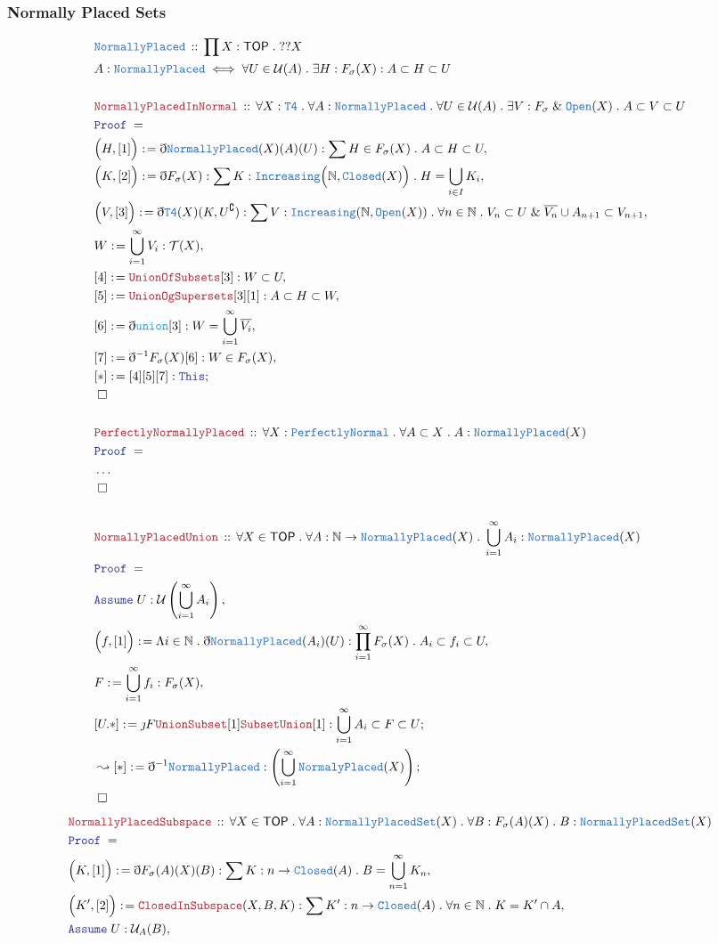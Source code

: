 \documentclass[12pt]{scrartcl}
\newcommand{\TYPE}[1]{\textcolor{NavyBlue}{\mathtt{#1}}}
\newcommand{\FUNC}[1]{\textcolor{Cerulean}{\mathtt{#1}}}
\newcommand{\LOGIC}[1]{\textcolor{Blue}{\mathtt{#1}}}
\newcommand{\THM}[1]{\textcolor{Maroon}{\mathtt{#1}}}
\renewcommand{\.}{\; . \;}
\newcommand{\de}{: \kern 0.1pc =}
\newcommand{\Act}[1]{\left( #1 \right)}
\newcommand{\Theorem}[2]{& \THM{#1} \, :: \, #2 \\ & \Proof = \\ }
\newcommand{\DeclareType}[2]{& \TYPE{#1} \, :: \, #2 \\}
\newcommand{\DefineType}[3]{& #1 : \TYPE{#2} \iff #3 \\}
\newcommand{\Page}[1]{ \begin{align*} #1 \end{align*}   }
\newcommand{ \bd }{ \ByDef }
\newcommand{\NoProof}{ & \ldots \\ \EndProof}
\renewcommand{\And}{\; \& \;}
\newcommand{\Nat}{\mathbb{N} }
\renewcommand{\c}{\complement}
\newcommand{\Say}[3]{& #1 \de #2 : #3, \\}
\newcommand{\Conclude}[3]{& #1 \de #2 : #3; \\}
\newcommand{\DeriveConclude}[3]{& \leadsto #1 \de #2 : #3 ; \\}
\newcommand{\Assume}[2]{& \LOGIC{Assume} \; #1 : #2, \\}
\newcommand{\QED}{\; \square}
\newcommand{\EndProof}{& \QED \\}
\newcommand{\ByDef}{\eth}
\newcommand{\ByConstr}{\jmath}
\newcommand{\Proof}{\LOGIC{Proof} \; }
\newcommand{\PN}{\TYPE{PerfectlyNormal}}
\newcommand{\TOP}{\mathsf{TOP}}
\newcommand{\T}{\mathcal{T}}
\newcommand{\U}{\mathcal{U}}
\begin{document}
\subsubsection{Normally Placed Sets}
\Page{
	\DeclareType{NormallyPlaced}{\prod X : \TOP \. ??X}
	\DefineType{A}{NormallyPlaced}
	{
		\forall U \in \U(A) \.
		\exists H : F_\sigma(X) :
		A \subset H \subset U
	}
	\\
	\Theorem{NormallyPlacedInNormal}
	{
		\forall X : \TYPE{T4} \.
		\forall A : \TYPE{NormallyPlaced} \.
		\forall U \in \U(A) \.
		\exists V : F_\sigma \And \TYPE{Open}(X) \.
		A \subset V \subset U
	}
	\Say{\Big(H,[1]\Big)}{\bd \TYPE{NormallyPlaced}(X)(A)(U)}
	{ \sum H \in F_\sigma(X) \. A \subset H \subset U}
	\Say{\Big(K,[2] \Big)}{ \bd F_\sigma(X)}
	{
		\sum K : \TYPE{Increasing}\Big(\Nat, \TYPE{Closed}(X)\Big) 
		\.
		H = \bigcup_{i \in I} K_i
	}
	\Say{\Big(V,[3]\Big)}{ \bd \TYPE{T4}(X)(K, U^\c)   }
	{ 
		\sum  V : \TYPE{Increasing}(\Nat, \TYPE{Open}(X))  \.    
		\forall n \in \Nat \.   V_n \subset U \And  \overline{V_n} \cup A_{n+1} \subset V_{n+1}
	}
	\Say{W}{\bigcup^\infty_{i=1} V_i}{\T(X)}
	\Say{[4]}{\THM{UnionOfSubsets}[3]}{W \subset U}
	\Say{[5]}{\THM{UnionOgSupersets}[3][1]}{A \subset H \subset W}
	\Say{[6]}{\bd \FUNC{union}[3]}{ W = \bigcup^\infty_{i=1} \overline{V_i}  }
	\Say{[7]}{\bd^{-1} F_\sigma(X)[6]}{ W \in F_\sigma(X) }
	\Conclude{[*]}{[4][5][7]}{ \LOGIC{This}  }
	\EndProof
	\\
	\Theorem{PerfectlyNormallyPlaced}
	{
		\forall X : \PN \.
		\forall A \subset X \.
		A : \TYPE{NormallyPlaced}(X)
	}
	\NoProof
	\\
	\Theorem{NormallyPlacedUnion}
	{
		\forall X \in \TOP \.
		\forall A : \Nat \to \TYPE{NormallyPlaced}(X) \.
		\bigcup^\infty_{i=1} A_i : \TYPE{NormallyPlaced}(X)
	}
	\Assume{U}{\U\Act{\bigcup^\infty_{i=1} A_i}}
	\Say{\Big(f,[1]\Big)}{\Lambda i \in \Nat \. \bd \TYPE{NormallyPlaced}(A_i)(U) }
	{
		\prod^\infty_{i=1} F_\sigma(X) \. A_i \subset  f_i \subset U
	}
	\Say{F}{\bigcup^\infty_{i=1} f_i}{F_\sigma(X)}
	\Conclude{[U.*]}{\ByConstr F \THM{UnionSubset}[1]\THM{SubsetUnion}[1]}
	{
		\bigcup^\infty_{i=1} A_i \subset F \subset U
	}
	\DeriveConclude{[*]}{\bd^{-1} \TYPE{NormallyPlaced}}{\Act{\bigcup^\infty_{i=1} \TYPE{NormalyPlaced}(X)} }
	\EndProof
}\Page{
	\Theorem{NormallyPlacedSubspace}
	{
		\forall X \in \TOP \.
		\forall A : \TYPE{NormallyPlacedSet}(X) \.
		\forall B : F_\sigma(A)(X) \.
		B : \TYPE{NormallyPlacedSet}(X) 
	}
	\Say{\Big( K, [1] \Big)}{\bd F_\sigma(A)(X)(B)}{\sum K : n \to \TYPE{Closed}(A) \. B = \bigcup^\infty_{n=1} K_n}
	\Say{\Big(K',[2]\Big)}{\THM{ClosedInSubspace}(X,B,K)}{
		\sum K' : n \to \TYPE{Closed}(A) \. 
		\forall n \in \Nat \. K = K' \cap A 
	}
	\Assume{U}{\U_A(B)}
}
\newpage
\end{document}
